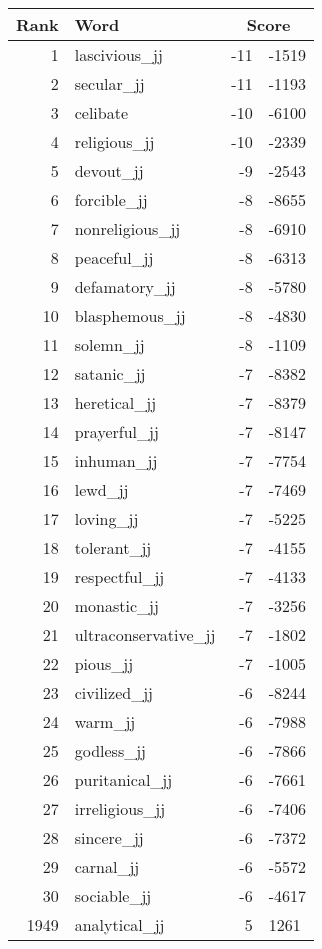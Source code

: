 \begin{longtable}[!htbp]{| rlr@{.}l |}
    \hline
    \textbf{Rank} & \textbf{Word} & \multicolumn{2}{c|}{\textbf{Score}} \\
    \hline
    \endhead
    1 & lascivious\_jj & -11 & -1519 \\
    2 & secular\_jj & -11 & -1193 \\
    3 & celibate & -10 & -6100 \\
    4 & religious\_jj & -10 & -2339 \\
    5 & devout\_jj & -9 & -2543 \\
    6 & forcible\_jj & -8 & -8655 \\
    7 & nonreligious\_jj & -8 & -6910 \\
    8 & peaceful\_jj & -8 & -6313 \\
    9 & defamatory\_jj & -8 & -5780 \\
    10 & blasphemous\_jj & -8 & -4830 \\
    11 & solemn\_jj & -8 & -1109 \\
    12 & satanic\_jj & -7 & -8382 \\
    13 & heretical\_jj & -7 & -8379 \\
    14 & prayerful\_jj & -7 & -8147 \\
    15 & inhuman\_jj & -7 & -7754 \\
    16 & lewd\_jj & -7 & -7469 \\
    17 & loving\_jj & -7 & -5225 \\
    18 & tolerant\_jj & -7 & -4155 \\
    19 & respectful\_jj & -7 & -4133 \\
    20 & monastic\_jj & -7 & -3256 \\
    21 & ultraconservative\_jj & -7 & -1802 \\
    22 & pious\_jj & -7 & -1005 \\
    23 & civilized\_jj & -6 & -8244 \\
    24 & warm\_jj & -6 & -7988 \\
    25 & godless\_jj & -6 & -7866 \\
    26 & puritanical\_jj & -6 & -7661 \\
    27 & irreligious\_jj & -6 & -7406 \\
    28 & sincere\_jj & -6 & -7372 \\
    29 & carnal\_jj & -6 & -5572 \\
    30 & sociable\_jj & -6 & -4617 \\
    1949 & analytical\_jj & 5 & 1261 \\

\end{longtable}
